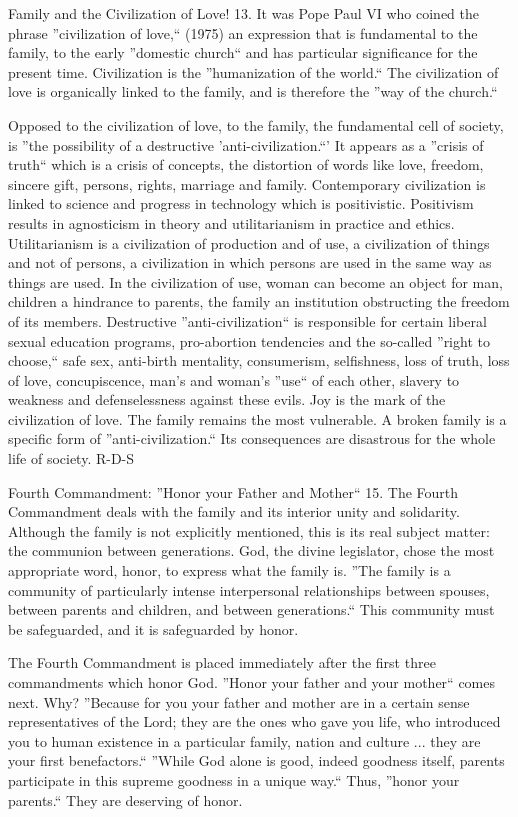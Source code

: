\documentclass[oneside]{book}
\begin{document}
Family and the Civilization of Love!
13. It was Pope Paul VI who coined the phrase ''civilization of love,`` (1975)
an expression that is fundamental to the family, to the early ''domestic
church`` and has particular significance for the present time. Civilization is
the ''humanization of the world.`` The civilization of love is organically
linked to the family, and is therefore the ''way of the church.``

Opposed to the civilization of love, to the family, the fundamental cell of
society, is ''the possibility of a destructive 'anti-civilization.``' It appears
as a ''crisis of truth`` which is a crisis of concepts, the distortion of words
like love, freedom, sincere gift, persons, rights, marriage and
family. Contemporary civilization is linked to science and progress in
technology which is positivistic. Positivism results in agnosticism in theory
and utilitarianism in practice and ethics. Utilitarianism is a civilization of
production and of use, a civilization of things and not of persons, a
civilization in which persons are used in the same way as things are used. In
the civilization of use, woman can become an object for man, children a
hindrance to parents, the family an institution obstructing the freedom of its
members. Destructive ''anti-civilization`` is responsible for certain liberal
sexual education programs, pro-abortion tendencies and the so-called ''right to
choose,`` safe sex, anti-birth mentality, consumerism, selfishness, loss of
truth, loss of love, concupiscence, man's and woman's ''use`` of each other,
slavery to weakness and defenselessness against these evils. Joy is the mark of
the civilization of love. The family remains the most vulnerable. A broken
family is a specific form of ''anti-civilization.`` Its consequences are
disastrous for the whole life of society.
R-D-S

Fourth Commandment: ''Honor your Father and Mother``
15. The Fourth Commandment deals with the family and its interior unity and
solidarity. Although the family is not explicitly mentioned, this is its real
subject matter: the communion between generations. God, the divine legislator,
chose the most appropriate word, honor, to express what the family is. ''The
family is a community of particularly intense interpersonal relationships
between spouses, between parents and children, and between generations.`` This
community must be safeguarded, and it is safeguarded by honor.

The Fourth Commandment is placed immediately after the first three commandments
which honor God. ''Honor your father and your mother`` comes next. Why?
''Because for you your father and mother are in a certain sense representatives
of the Lord; they are the ones who gave you life, who introduced you to human
existence in a particular family, nation and culture ... they are your first
benefactors.`` ''While God alone is good, indeed goodness itself, parents
participate in this supreme goodness in a unique way.`` Thus, ''honor your
parents.`` They are deserving of honor.
\end{document}
